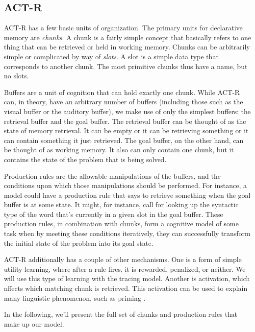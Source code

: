 \subsection{ACT-R}
ACT-R has a few basic units of organization. The primary units for declarative memory are \textit{chunks}. A chunk is a fairly simple concept that basically refers to one thing that can be retrieved or held in working memory. Chunks can be arbitrarily simple or complicated by way of \textit{slots}. A slot is a simple data type that corresponds to another chunk. The most primitive chunks thus have a name, but no slots. 

Buffers are a unit of cognition that can hold exactly one chunk. While ACT-R can, in theory, have an arbitrary number of buffers (including those such as the visual buffer or the auditory buffer), we make use of only the simplest buffers: the retrieval buffer and the goal buffer. The retrieval buffer can be thought of as the state of memory retrieval. It can be empty or it can be retrieving something or it can contain something it just retrieved. The goal buffer, on the other hand, can be thought of as working memory. It also can only contain one chunk, but it contains the state of the problem that is being solved. 

Production rules are the allowable manipulations of the buffers, and the conditions upon which those manipulations should be performed. For instance, a model could have a production rule that says to retrieve something when the goal buffer is at some state. It might, for instance, call for looking up the syntactic type of the word that's currently in a given slot in the goal buffer. These production rules, in combination with chunks, form a cognitive model of some task when by meeting these conditions iteratively, they can successfully transform the initial state of the problem into its goal state. 

ACT-R additionally has a couple of other mechanisms. One is a form of simple utility learning, where after a rule fires, it is rewarded, penalized, or neither. We will use this type of learning with the tracing model. Another is activation, which affects which matching chunk is retrieved. This activation can be used to explain many linguistic phenomenon, such as priming \citep{priming} \citep{model}.  

In the following, we'll present the full set of chunks and production rules that make up our model. 